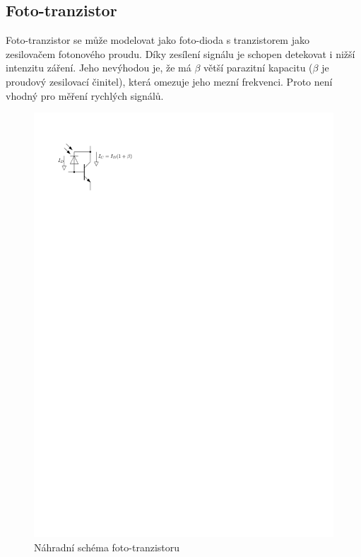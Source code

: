 \subsection{Foto-tranzistor}
Foto-tranzistor se může modelovat jako foto-dioda s tranzistorem jako zesilovačem fotonového proudu. Díky zesílení signálu je schopen detekovat i nižší intenzitu záření. Jeho nevýhodou je, že má $\beta$ větší parazitní kapacitu ($\beta$ je proudový zesilovací činitel), která omezuje jeho mezní frekvenci. Proto není vhodný pro měření rychlých signálů.

\begin{figure}[H]
    \begin{center}
        \includegraphics[scale=1]{img/foto-tran}
    \end{center}
    \caption{Náhradní schéma foto-tranzistoru}
\end{figure}

